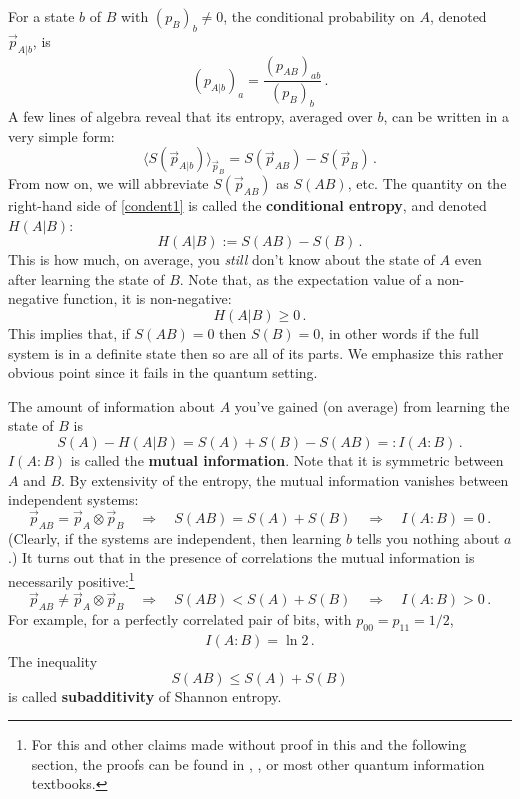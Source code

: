 \documentclass[11pt]{article}
\newcommand{\ev}[1]{\langle{#1}\rangle}
\begin{document}
For a state $b$ of $B$ with $(p_B)_b\neq0$, the conditional probability on $A$, denoted $\vec p_{A|b}$, is
\begin{equation}
(p_{A|b})_a = \frac{(p_{AB})_{ab}}{(p_B)_b}\,.
\end{equation}
A few lines of algebra reveal that its entropy, averaged over $b$, can be written in a very simple form:
\begin{equation}\label{condent1}
\ev{S(\vec p_{A|b})}_{\vec p_B} = S(\vec p_{AB})-S(\vec p_B)\,.
\end{equation}
From now on, we will abbreviate $S(\vec p_{AB})$ as $S(AB)$, etc. The quantity on the right-hand side of \eqref{condent1} is called the \textbf{conditional entropy}, and denoted $H(A|B)$:
\begin{equation}
H(A|B):=S(AB)-S(B)\,.
\end{equation}
This is how much, on average, you \emph{still} don't know about the state of $A$ even after learning the state of $B$. Note that, as the expectation value of a non-negative function, it is non-negative:
\begin{equation}
H(A|B)\ge 0\,.
\end{equation}
This implies that, if $S(AB)=0$ then $S(B)=0$, in other words if the full system is in a definite state then so are all of its parts. We emphasize this rather obvious point since it fails in the quantum setting.

The amount of information about $A$ you've gained (on average) from learning the state of $B$ is
\begin{equation}
S(A)-H(A|B) = S(A)+S(B)-S(AB)=:I(A:B)\,.
\end{equation}
$I(A:B)$ is called the \textbf{mutual information}. Note that it is symmetric between $A$ and $B$. By extensivity of the entropy, the mutual information vanishes between independent systems:
\begin{equation}
\vec p_{AB}=\vec p_A\otimes\vec p_B\quad\Rightarrow\quad S(AB)=S(A)+S(B)\quad\Rightarrow\quad I(A:B)=0\,.
\end{equation}
(Clearly, if the systems are independent, then learning $b$ tells you nothing about $a$.) It turns out that in the presence of correlations the mutual information is necessarily positive:\footnote{For this and other claims made without proof in this and the following section, the proofs can be found in \cite{Wehrl}, \cite{NielsenChuang}, or most other quantum information textbooks.}
\begin{equation}
\vec p_{AB}\neq\vec p_A\otimes\vec p_{B}\quad\Rightarrow\quad
S(AB)<S(A)+S(B)\quad\Rightarrow\quad
I(A:B)>0\,.
\end{equation}
For example, for a perfectly correlated pair of bits, with $p_{00}=p_{11}=1/2$,
\begin{eqnarray}
I(A:B)=\ln2\,.
\end{eqnarray}
The inequality
\begin{equation}
S(AB)\le S(A)+S(B)
\end{equation}
is called \textbf{subadditivity} of Shannon entropy.
\end{document}
